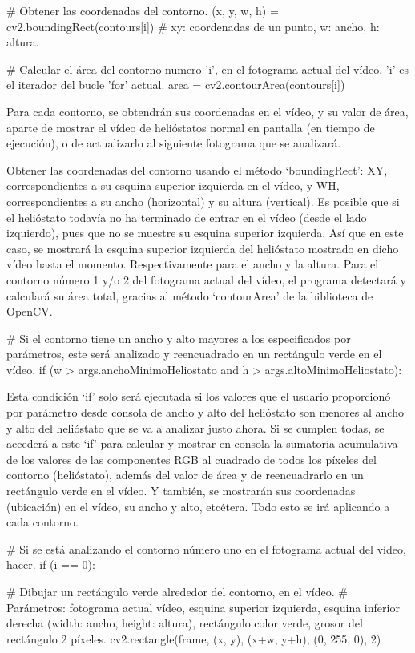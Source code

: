 \documentclass[12pt]{article}
\begin{document}
        
        \# Obtener las coordenadas del contorno.
        (x, y, w, h) = cv2.boundingRect(contours[i]) \# xy: coordenadas de un punto, w: ancho, h: altura.

        \# Calcular el área del contorno numero 'i', en el fotograma actual del vídeo. 'i' es el iterador del bucle 'for' actual.
        area = cv2.contourArea(contours[i])
        
Para cada contorno, se obtendrán sus coordenadas en el vídeo, y su valor de área, aparte de mostrar el vídeo de helióstatos normal en pantalla (en tiempo de ejecución), o de actualizarlo al siguiente fotograma que se analizará.

Obtener las coordenadas del contorno usando el método ‘boundingRect’: XY, correspondientes a su esquina superior izquierda en el vídeo, y WH, correspondientes a su ancho (horizontal) y su altura (vertical). Es posible que si el helióstato todavía no ha terminado de entrar en el vídeo (desde el lado izquierdo), pues que no se muestre su esquina superior izquierda. Así que en este caso, se mostrará la esquina superior izquierda del helióstato mostrado en dicho vídeo hasta el momento. Respectivamente para el ancho y la altura.
Para el contorno número 1 y/o 2 del fotograma actual del vídeo, el programa detectará y calculará su área total, gracias al método ‘contourArea’ de la biblioteca de OpenCV.


        \# Si el contorno tiene un ancho y alto mayores a los especificados por parámetros, este será analizado y reencuadrado en un rectángulo verde en el vídeo.
        if (w > args.anchoMinimoHeliostato and h > args.altoMinimoHeliostato):

Esta condición ‘if’ solo será ejecutada si los valores que el usuario proporcionó por parámetro desde consola de ancho y alto del helióstato son menores al ancho y alto del helióstato que se va a analizar justo ahora. Si se cumplen todas, se accederá a este ‘if’ para calcular y mostrar en consola la sumatoria acumulativa de los valores de las componentes RGB al cuadrado de todos los píxeles del contorno (helióstato), además del valor de área y de reencuadrarlo en un rectángulo verde en el vídeo. Y también, se mostrarán sus coordenadas (ubicación) en el vídeo, su ancho y alto, etcétera. Todo esto se irá aplicando a cada contorno.
            

            \# Si se está analizando el contorno número uno en el fotograma actual del vídeo, hacer.
            if (i == 0):

                \# Dibujar un rectángulo verde alrededor del contorno, en el vídeo.
                \# Parámetros: fotograma actual vídeo, esquina superior izquierda, esquina inferior derecha (width: ancho, height: altura), rectángulo color verde, grosor del rectángulo 2 píxeles.
                cv2.rectangle(frame, (x, y), (x+w, y+h), (0, 255, 0), 2)
\end{document}
